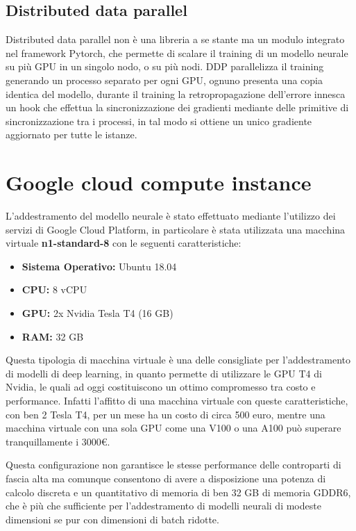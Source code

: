 \subsection{Distributed data parallel}
Distributed data parallel non è una libreria a se stante ma un modulo integrato nel framework Pytorch,
che permette di scalare il training di un modello neurale su più GPU in un singolo nodo, o su più nodi.
DDP parallelizza il training generando un processo separato per ogni GPU, ognuno presenta
una copia identica del modello, durante il training la retropropagazione dell'errore innesca un hook che effettua la 
sincronizzazione dei gradienti mediante delle primitive di sincronizzazione tra i processi, in tal modo 
si ottiene un unico gradiente aggiornato per tutte le istanze.

\section{Google cloud compute instance\ok}
L'addestramento del modello neurale è stato effettuato mediante l'utilizzo dei servizi di Google Cloud Platform, 
in particolare è stata utilizzata una macchina virtuale \textbf{n1-standard-8} con le seguenti caratteristiche:

\begin{itemize}
    \item \textbf{Sistema Operativo:} Ubuntu 18.04
    \item \textbf{CPU:} 8 vCPU
    \item \textbf{GPU:} 2x Nvidia Tesla T4 (16 GB)
    \item \textbf{RAM:} 32 GB 
\end{itemize}

Questa tipologia di macchina virtuale è una delle consigliate per l'addestramento di modelli di deep learning, in quanto permette di utilizzare
le GPU T4 di Nvidia, le quali ad oggi costituiscono un ottimo compromesso tra costo e performance. Infatti l'affitto di una macchina
virtuale con queste caratteristiche, con ben 2 Tesla T4, per un mese ha un costo di circa 500 euro, mentre una macchina virtuale con una sola GPU 
come una V100 o una A100 può superare tranquillamente i 3000€.

Questa configurazione non garantisce le stesse performance delle controparti di fascia alta ma comunque consentono di avere a disposizione
una potenza di calcolo discreta e un quantitativo di memoria di ben 32 GB di memoria GDDR6, che è più che sufficiente per l'addestramento di modelli
neurali di modeste dimensioni se pur con dimensioni di batch ridotte.

